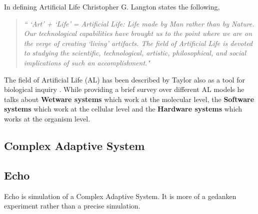 In defining Artificial Life Christopher G. Langton states the following,

\begin{quote}
\textsl{`` `Art' + `Life' = Artificial Life: Life made by Man rather than by Nature. Our technological capabilities have brought us to the point where we are on the verge of creating `living' artifacts. The field of Artificial Life is devoted to studying the scientific, technological, artistic, philosophical, and social implications of such an accomplishment."}
\end{quote}

The field of Artificial Life (AL) has been described by Taylor also as a tool for biological inquiry \cite{taylor1993}. While providing a brief survey over different AL models he talks about \textbf{Wetware systems} which work at the molecular level, the \textbf{Software systems} which work at the cellular level and the \textbf{Hardware systems} which works at the organism level.






\subsection{Complex Adaptive System}

\subsection{Echo}
Echo is simulation of a Complex Adaptive System. It is more of a gedanken experiment rather than a precise simulation.

